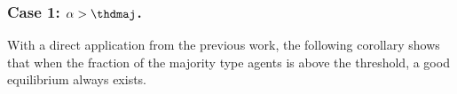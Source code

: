 


\subsubsection{Case 1: $\alpha > \thdmaj$.}
With a direct application from the previous work, the following corollary shows that when the fraction of the majority type agents is above the threshold, a good equilibrium always exists. 

